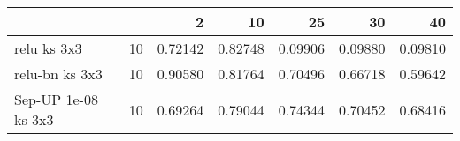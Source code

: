 \begin{tabular}{llrrrrr}
\toprule
                    &    &       2  &       10 &       25 &       30 &       40 \\
\midrule
relu ks 3x3 & 10 &  0.72142 &  0.82748 &  0.09906 &  0.09880 &  0.09810 \\
relu-bn ks 3x3 & 10 &  0.90580 &  0.81764 &  0.70496 &  0.66718 &  0.59642 \\
Sep-UP 1e-08 ks 3x3 & 10 &  0.69264 &  0.79044 &  0.74344 &  0.70452 &  0.68416 \\
\bottomrule
\end{tabular}
